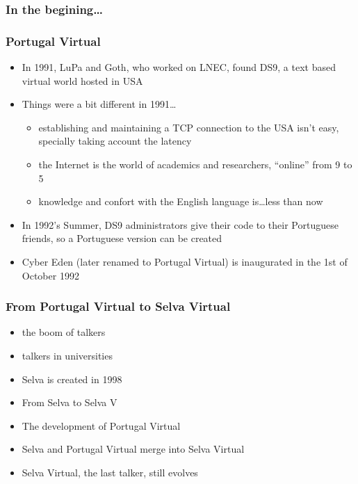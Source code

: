 \documentclass[aspectratio=169]{beamer}
\begin{document}
\begin{frame}
\frametitle{In the begining\ldots}
\end{frame}

\begin{frame}
\frametitle{Portugal Virtual}
  \begin{itemize}
    \item{} In 1991, LuPa and Goth, who worked on LNEC, found DS9, a text based virtual world hosted in USA
    \item{} Things were a bit different in 1991\ldots
      \begin{itemize}
        \item{} establishing and maintaining a TCP connection to the USA isn't easy, specially taking account the latency
        \item{} the Internet is the world of academics and researchers, ``online'' from 9 to 5
        \item{} knowledge and confort with the English language is\ldots less than now
      \end{itemize}
    \item{} In 1992's Summer, DS9 administrators give their code to their Portuguese friends, so a Portuguese version can be created
    \item{} Cyber Eden (later renamed to Portugal Virtual) is inaugurated in the 1st of October 1992
  \end{itemize}
\end{frame}

\begin{frame}
\frametitle{From Portugal Virtual to Selva Virtual}
  \begin{itemize}
    \item{} the boom of talkers
    \item{} talkers in universities
    \item{} Selva is created in 1998
    \item{} From Selva to Selva V
    \item{} The development of Portugal Virtual
    \item{} Selva and Portugal Virtual merge into Selva Virtual
    \item{} Selva Virtual, the last talker, still evolves
  \end{itemize}
\end{frame}
\end{document}
